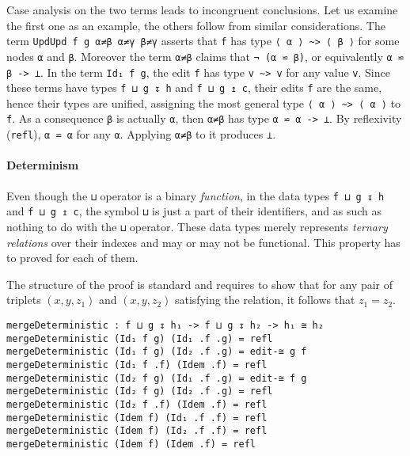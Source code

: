 \documentclass[../Thesis.tex]{subfiles}
\begin{document}
	Case analysis on the two terms leads to incongruent conclusions.
	Let us examine the first one as an example, the others follow from 
	similar considerations.
	The term \texttt{UpdUpd f g α≠β α≠γ β≠γ} asserts that 
	\texttt{f} has type \texttt{⟨ α ⟩ \textasciitilde> ⟨ β ⟩} for some 
	nodes \texttt{α} and \texttt{β}. Moreover the term
	\texttt{α≠β} claims that \texttt{¬ (α ⋍ β)}, or equivalently
	\texttt{α ⋍ β -> ⊥}.
	In the term \texttt{Id₁ f g}, the edit \texttt{f} 
	has type \texttt{v \textasciitilde> v} for any value \texttt{v}. Since these 
	terms have types	\texttt{f ⊔ g ↧ h} and \texttt{f ⊔ g ↥ c}, their edits 
	\texttt{f} are the same, hence their types are unified, assigning the most 
	general type \texttt{⟨ α ⟩ \textasciitilde> ⟨ α ⟩} to \texttt{f}.
	As a consequence \texttt{β} is actually \texttt{α}, then \texttt{α≠β}
	has type \texttt{α ⋍ α -> ⊥}. By reflexivity (\texttt{refl}), \texttt{α ⋍ α} for
	any \texttt{α}. Applying \texttt{α≠β} to it produces \texttt{⊥}.
	
	\paragraph{Determinism}
	Even though the \texttt{⊔} operator is a binary \emph{function}, 
	in the data types \texttt{f ⊔ g ↧ h} and \texttt{f ⊔ g ↥ c}, the symbol
	\texttt{⊔} is just a part of their identifiers, and as such as nothing to
	do with the \texttt{⊔} operator.
	These data types merely represents \emph{ternary relations} over their 
	indexes and may or may not be functional.
	This property has to proved for each of them.
	
	The structure of the proof is standard and requires to show that for any 
	pair of triplets $(x, y, z_1)$ and $(x, y, z_2)$ satisfying
	the relation, it follows that $z_1 = z_2$.
	
\begin{verbatim}
mergeDeterministic : f ⊔ g ↧ h₁ -> f ⊔ g ↧ h₂ -> h₁ ≅ h₂
mergeDeterministic (Id₁ f g) (Id₁ .f .g) = refl
mergeDeterministic (Id₁ f g) (Id₂ .f .g) = edit-≅ g f
mergeDeterministic (Id₁ f .f) (Idem .f) = refl
mergeDeterministic (Id₂ f g) (Id₁ .f .g) = edit-≅ f g
mergeDeterministic (Id₂ f g) (Id₂ .f .g) = refl
mergeDeterministic (Id₂ f .f) (Idem .f) = refl
mergeDeterministic (Idem f) (Id₁ .f .f) = refl
mergeDeterministic (Idem f) (Id₂ .f .f) = refl
mergeDeterministic (Idem f) (Idem .f) = refl
\end{verbatim}
\end{document}
